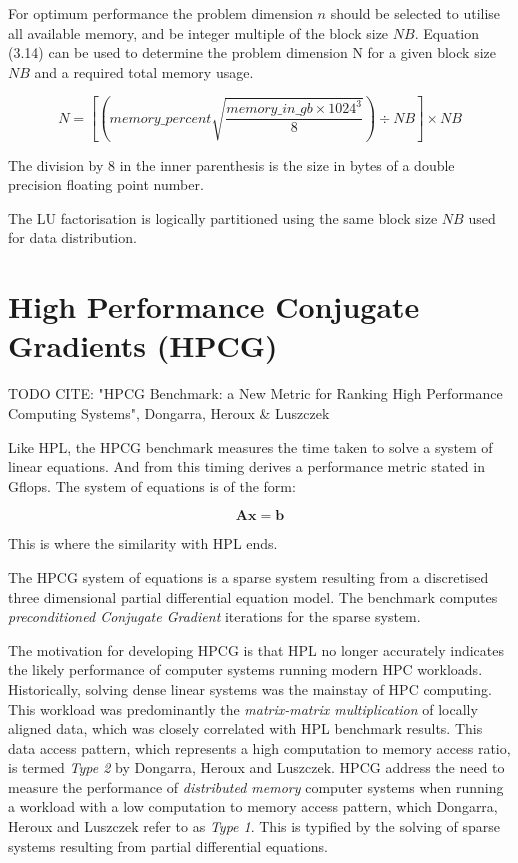 For optimum performance the problem dimension $n$ should be selected to utilise all available memory, and be integer multiple of the block size $NB$. Equation (3.14) can be used to determine the problem dimension N for a given block size $NB$ and a required total memory usage.

\begin{equation}
N = \left[\left(memory\_percent \sqrt{\frac{memory\_in\_gb \times 1024^3}{8}}\right) \div NB\right] \times NB
\end{equation}

The division by 8 in the inner parenthesis is the size in bytes of a double precision floating point number.

The LU factorisation is logically partitioned using the same block size $NB$ used for data distribution.


%
%
\section{High Performance Conjugate Gradients (HPCG)}

TODO CITE: "HPCG Benchmark: a New Metric for Ranking High Performance Computing Systems", Dongarra, Heroux \& Luszczek

Like HPL, the HPCG benchmark measures the time taken to solve a system of linear equations. And from this timing derives a performance metric stated in Gflops. The system of equations is of the form:

\begin{equation}
\mathbf{Ax} = \mathbf{b}
\end{equation}

This is where the similarity with HPL ends.

The HPCG system of equations is a sparse system resulting from a discretised three dimensional partial differential equation model. The benchmark computes \emph{preconditioned Conjugate Gradient} iterations for the sparse system.

The motivation for developing HPCG is that HPL no longer accurately indicates the likely performance of computer systems running modern HPC workloads. Historically, solving dense linear systems was the mainstay of HPC computing. This workload was predominantly the \emph{matrix-matrix multiplication} of locally aligned data, which was closely correlated with HPL benchmark results. This data access pattern, which represents a high computation to memory access ratio, is termed \emph{Type 2} by Dongarra, Heroux and Luszczek. HPCG address the need to measure the performance of \emph{distributed memory} computer systems when running a workload with a low computation to memory access pattern, which Dongarra, Heroux and Luszczek refer to as \emph{Type 1}. This is typified by the solving of sparse systems resulting from partial differential equations.

